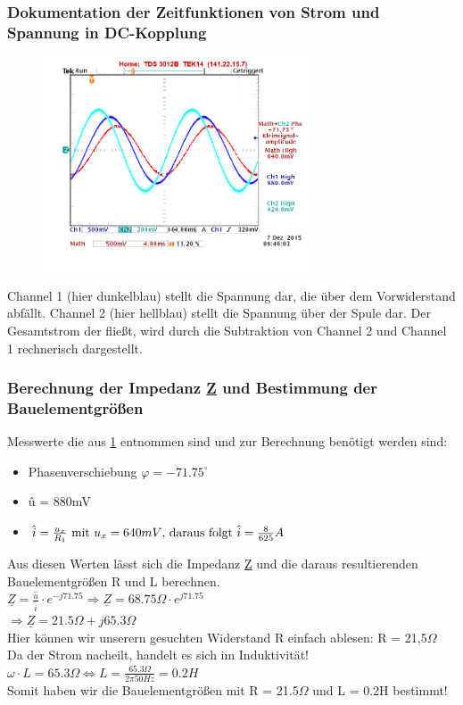 \documentclass[11pt,a4paper,titlepage]{article}
\begin{document}
\subsubsection{Dokumentation der Zeitfunktionen von Strom und Spannung in DC-Kopplung}
\begin{figure}[h!]
\label{fig:aufg1}
\begin{center}
\includegraphics[width=0.7\textwidth]{5_1_1}
\end{center}
\end{figure}
Channel 1 (hier dunkelblau) stellt die Spannung dar, die \"uber dem Vorwiderstand abf\"allt. Channel 2 (hier hellblau) stellt die Spannung \"uber der Spule dar. Der Gesamtstrom der flie\ss{}t, wird durch die Subtraktion von Channel 2 und Channel 1 rechnerisch dargestellt.
\subsubsection{Berechnung der Impedanz \underline{Z} und Bestimmung der Bauelementgr\"o\ss{}en}
Messwerte die aus \ref{fig:aufg1} entnommen sind und zur Berechnung ben\"otigt werden sind:
\begin{itemize}
\item Phasenverschiebung $\varphi = -71.75^\circ$
\item \^u = 880mV
\item \(\hat{i} = \frac{u_x}{R_1}$ mit $u_x = 640mV$, daraus folgt $\hat{i} = \frac{8}{625}A\) 
\end{itemize}  
Aus diesen Werten l\"asst sich die Impedanz \underline{Z} und die daraus resultierenden Bauelementgr\"o\ss{}en R und L berechnen. \\[1ex]
\(\underline{Z} = \frac{\hat{u}}{\hat{i}} \cdot e^{-j71.75} \Rightarrow \underline{Z} = 68.75\Omega \cdot e^{j71.75}\) \\[1ex]
$\Rightarrow \underline{Z} = 21.5\Omega + j65.3\Omega$ \\[1ex]
Hier k\"onnen wir unserern gesuchten Widerstand R einfach ablesen: R = 21,5$\Omega$ \\[1ex]
Da der Strom nacheilt, handelt es sich im Induktivit\"at! \\[1ex]
$\omega \cdot L = 65.3\Omega \Leftrightarrow L = \frac{65.3\Omega}{2\pi50Hz} = 0.2H$ \\[1ex]
Somit haben wir die Bauelementgr\"o\ss{}en mit R = 21.5$\Omega$ und L = 0.2H bestimmt!
\newpage
\end{document}
